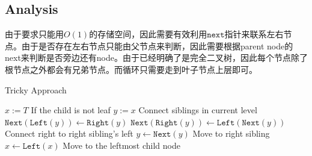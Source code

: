 \subsection{Analysis}
\begin{CJK*}{UTF8}{gbsn}
由于要求只能用$O(1)$的存储空间，因此需要有效利用$\texttt{next}$指针来联系左右节点。由于是否存在左右节点只能由父节点来判断，因此需要根据parent node的next来判断是否旁边还有node。由于已经明确了是完全二叉树，因此每个节点除了根节点之外都会有兄弟节点。而循环只需要走到叶子节点上层即可。
\end{CJK*}
\setcounter{algorithm}{0}
\begin{algorithm}[H]
\caption{Tricky Approach}
\begin{algorithmic}[1]
\State \Return
\EndIf
\State $x:=T$
 \Comment If the child is not leaf
\State $y:=x$ 
 \Comment Connect siblings in current level
\State $\texttt{Next}(\texttt{Left}(y))\gets \texttt{Right}(y)$
\State $\texttt{Next}(\texttt{Right}(y))\gets\texttt{Left}(\texttt{Next}(y))$ \Comment Connect right to right sibling's left
\EndIf
\State $y\gets \texttt{Next}(y)$ \Comment Move to right sibling
\EndWhile
\State $x\gets \texttt{Left}(x)$ \Comment Move to the leftmost child node 
\EndWhile
\EndProcedure
\end{algorithmic}
\end{algorithm}
